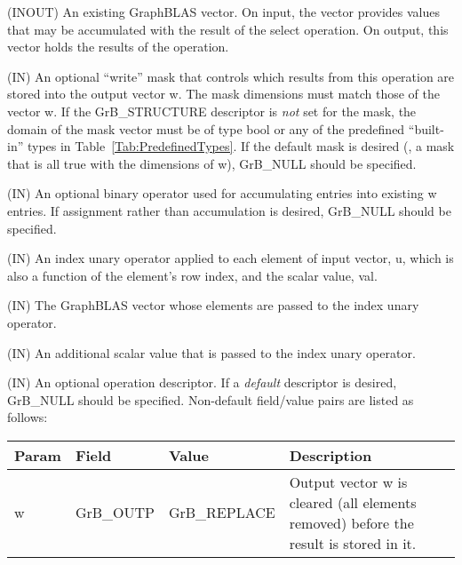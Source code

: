 \begin{itemize}[leftmargin=1.1in]
    \item[{\sf w}]    ({\sf INOUT}) An existing GraphBLAS vector.  On input,
    the vector provides values that may be accumulated with the result of the
    select operation.  On output, this vector holds the results of the
    operation.

    \item[{\sf mask}] ({\sf IN}) An optional ``write'' mask that controls which
    results from this operation are stored into the output vector {\sf w}. The 
    mask dimensions must match those of the vector {\sf w}. If the 
    {\sf GrB\_STRUCTURE} descriptor is {\em not} set for the mask, the domain of the
    {\sf mask} vector must be of type {\sf bool} or any of the predefined 
    ``built-in'' types in Table~\ref{Tab:PredefinedTypes}.  If the default
    mask is desired (\ie, a mask that is all {\sf true} with the dimensions of {\sf w}), 
    {\sf GrB\_NULL} should be specified.

    \item[{\sf accum}] ({\sf IN}) An optional binary operator used for accumulating
    entries into existing {\sf w} entries. If assignment rather than accumulation is
    desired, {\sf GrB\_NULL} should be specified.

{\color{red}
    \item[{\sf op}] ({\sf IN}) An index unary operator applied to each element of input 
    vector, {\sf u}, which is also a function of the element's row index, 
    and the scalar value, {\sf val}.
}
    \item[{\sf u}] ({\sf IN}) The GraphBLAS vector whose elements are passed 
    to the index unary operator.

    \item[{\sf val}] ({\sf IN}) An additional scalar value that is passed to the 
    index unary operator.
    
    \item[{\sf desc}] ({\sf IN}) An optional operation descriptor. If
    a \emph{default} descriptor is desired, {\sf GrB\_NULL} should be
    specified. Non-default field/value pairs are listed as follows:  \\

    \hspace*{-2em}\begin{tabular}{lllp{2.7in}}
        Param & Field  & Value & Description \\
        \hline
        {\sf w}    & {\sf GrB\_OUTP} & {\sf GrB\_REPLACE} & Output vector {\sf w}
        is cleared (all elements removed) before the result is stored in it.\\


\end{tabular}
\end{itemize}
